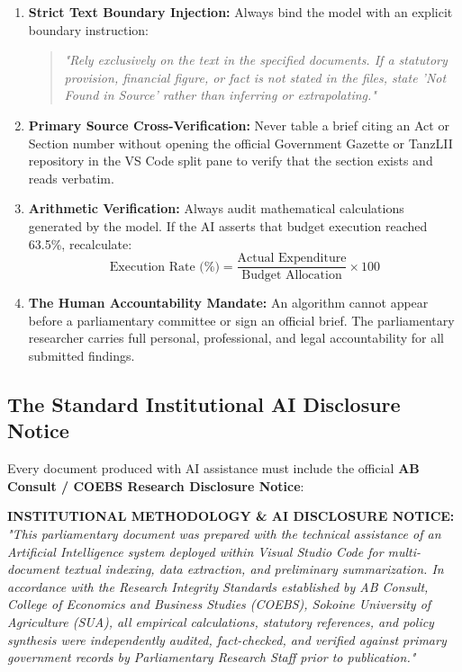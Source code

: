 \documentclass[11pt, a4paper]{report}
\begin{document}
\begin{enumerate}[label=\textbf{Step \arabic*:}]
    \item \textbf{Strict Text Boundary Injection:} Always bind the model with an explicit boundary instruction:
    \begin{quote}
        \small\textit{"Rely exclusively on the text in the specified documents. If a statutory provision, financial figure, or fact is not stated in the files, state 'Not Found in Source' rather than inferring or extrapolating."}
    \end{quote}
    \item \textbf{Primary Source Cross-Verification:} Never table a brief citing an Act or Section number without opening the official Government Gazette or TanzLII repository in the VS Code split pane to verify that the section exists and reads verbatim.
    \item \textbf{Arithmetic Verification:} Always audit mathematical calculations generated by the model. If the AI asserts that budget execution reached 63.5\%, recalculate:
    \begin{equation*}
        \text{Execution Rate (\%)} = \frac{\text{Actual Expenditure}}{\text{Budget Allocation}} \times 100
    \end{equation*}
    \item \textbf{The Human Accountability Mandate:} An algorithm cannot appear before a parliamentary committee or sign an official brief. The parliamentary researcher carries full personal, professional, and legal accountability for all submitted findings.
\end{enumerate}

\subsection{The Standard Institutional AI Disclosure Notice}
Every document produced with AI assistance must include the official \textbf{AB Consult / COEBS Research Disclosure Notice}:

\begin{tcolorbox}[colback=calloutbg, colframe=bordergrey, title=\textbf{Standard Institutional AI Disclosure Notice}]
\small
\textbf{INSTITUTIONAL METHODOLOGY \& AI DISCLOSURE NOTICE:}\\
\textit{"This parliamentary document was prepared with the technical assistance of an Artificial Intelligence system deployed within Visual Studio Code for multi-document textual indexing, data extraction, and preliminary summarization. In accordance with the Research Integrity Standards established by AB Consult, College of Economics and Business Studies (COEBS), Sokoine University of Agriculture (SUA), all empirical calculations, statutory references, and policy synthesis were independently audited, fact-checked, and verified against primary government records by Parliamentary Research Staff prior to publication."}
\end{tcolorbox}
\end{document}
